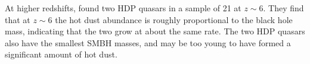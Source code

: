 At higher redshifts, \citet{jiang10} found two HDP quasars in a sample of 21 at $z\sim6$. 
They find that at $z\sim6$ the hot dust abundance is roughly proportional to the black hole mass, indicating that the two grow at about the same rate. 
The two HDP quasars also have the smallest SMBH masses, and may be too young to have formed a significant amount of hot dust.
